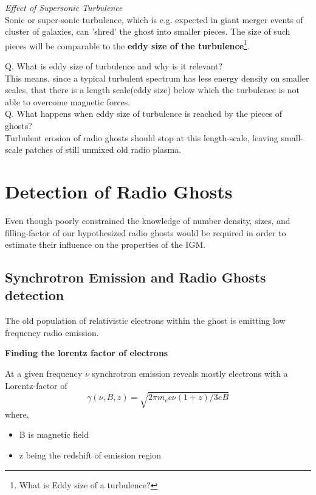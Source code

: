 \documentclass[11pt]{report}
\newcommand{\tbf}[1]{\textbf{#1}}
\newcommand{\tit}[1]{\textit{#1}}
\newcommand{\fn}[1]{\footnote{#1}}
\begin{document}
\tit{Effect of Supersonic Turbulence}\\
    
    Sonic or super-sonic turbulence, which is e.g. expected in giant merger events of cluster of galaxies, can 'shred' the ghost into smaller pieces. The size of such pieces will be comparable to the \tbf{eddy size of the turbulence}\fn{What is Eddy size of a turbulence?}.
    
 Q. What is eddy size of turbulence and why is it relevant?\\
 
 This means, since a typical turbulent spectrum has less energy density on smaller scales, that there is a length scale(eddy size) below which the turbulence is not able to overcome magnetic forces.\\
 
Q. What happens when eddy size of turbulence is reached by the pieces of ghosts?\\
 
  Turbulent erosion of radio ghosts should stop at this length-scale, leaving small-scale patches of still unmixed old radio plasma.


\section{Detection of Radio Ghosts}

Even though poorly constrained the knowledge of  number density, sizes, and filling-factor of our hypothesized radio ghosts  would be required in order to estimate their influence on the properties of the IGM. 

\subsection{Synchrotron Emission and Radio Ghosts detection}
The old population of relativistic electrons within the ghost is emitting low frequency radio emission. 

\tbf{Finding the lorentz factor of electrons}

At a given frequency $\nu$ synchrotron emission reveals mostly electrons with a Lorentz-factor of 
\begin{equation}
\gamma(\nu,B,z)=\sqrt{2 \pi m_e c \nu (1+z)/3eB}
\end{equation}
where,
\begin{itemize}
\item B is magnetic field
\item z being the redshift of emission region
\end{itemize}
\end{document}
